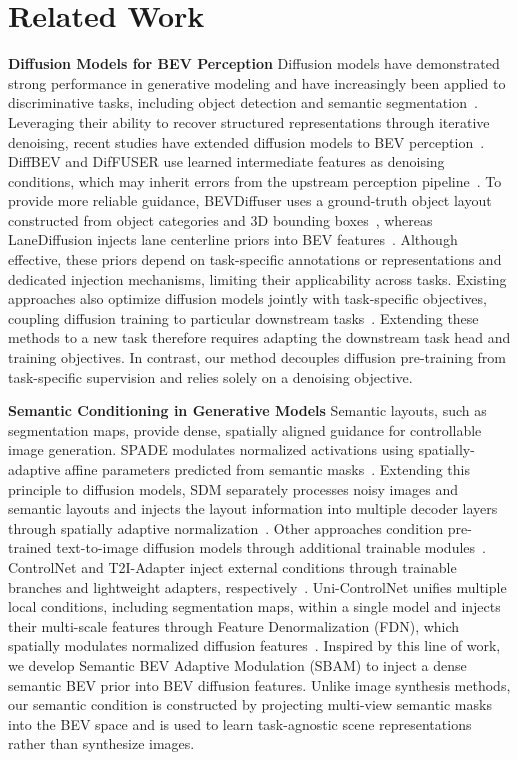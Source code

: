 \documentclass{article} %
\begin{document}
\section{Related Work}
\textbf{Diffusion Models for BEV Perception}
Diffusion models have demonstrated strong performance in generative modeling and
have increasingly been applied to discriminative tasks, including object
detection and semantic segmentation~\citep{DDPM,LDM,DDet,Segdiff}. Leveraging
their ability to recover structured representations through iterative
denoising, recent studies have extended diffusion models to BEV
perception~\citep{DiffBEV,DifFUSER,DiffVecMap,BEVDiff,LaneDiff}. DiffBEV and
DifFUSER use learned intermediate features as denoising conditions, which may
inherit errors from the upstream perception pipeline~\citep{DiffBEV,DifFUSER}.
To provide more reliable guidance, BEVDiffuser uses a ground-truth object layout
constructed from object categories and 3D bounding boxes~\citep{BEVDiff},
whereas LaneDiffusion injects lane centerline priors into BEV
features~\citep{LaneDiff}. Although effective, these priors depend on
task-specific annotations or representations and dedicated injection mechanisms,
limiting their applicability across tasks. Existing approaches also optimize
diffusion models jointly with task-specific objectives, coupling diffusion
training to particular downstream
tasks~\citep{DiffBEV,DifFUSER,DiffVecMap,BEVDiff,LaneDiff}. Extending these
methods to a new task therefore requires adapting the downstream task head and
training objectives. In contrast, our method decouples diffusion pre-training
from task-specific supervision and relies solely on a denoising objective.

\textbf{Semantic Conditioning in Generative Models}
Semantic layouts, such as segmentation maps, provide dense, spatially aligned
guidance for controllable image generation. SPADE modulates normalized
activations using spatially-adaptive affine parameters predicted from semantic
masks~\citep{SPADE}. Extending this principle to diffusion models, SDM
separately processes noisy images and semantic layouts and injects the layout
information into multiple decoder layers through spatially adaptive
normalization~\citep{SDM}. Other approaches condition pre-trained text-to-image
diffusion models through additional trainable
modules~\citep{Controlnet,GLIGEN,T2IAdapter}. ControlNet and T2I-Adapter inject
external conditions through trainable branches and lightweight adapters,
respectively~\citep{Controlnet,T2IAdapter}. Uni-ControlNet unifies multiple
local conditions, including segmentation maps, within a single model and injects
their multi-scale features through Feature Denormalization (FDN), which
spatially modulates normalized diffusion features~\citep{Uni-C}. Inspired by
this line of work, we develop Semantic BEV Adaptive Modulation (SBAM) to inject 
a dense semantic BEV prior into BEV diffusion features. Unlike image synthesis methods, 
our semantic condition is constructed by projecting multi-view semantic masks into 
the BEV space and is used to learn task-agnostic scene representations rather than 
synthesize images.
\end{document}
